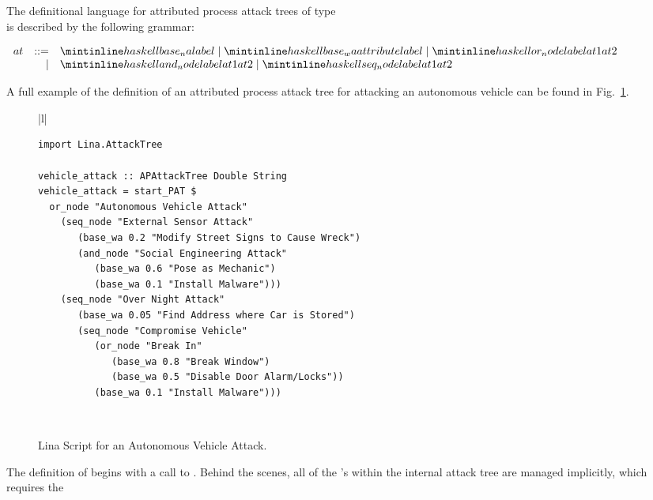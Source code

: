 \documentclass{llncs}
\begin{document}
The definitional language for attributed process attack trees of type \\
 is described by the following
grammar:
\begin{center}
  \footnotesize
  \begin{math}
    \begin{array}{lrlll}
      at & ::=  & \mh{base_na label} \mid \mh{base_wa attribute label} \mid \mh{or_node label at1 at2} \\
      & \mid & \mh{and_node label at1 at2} \mid \mh{seq_node label at1 at2}\\
    \end{array}
  \end{math}
\end{center}
A full example of the definition of an attributed process attack tree
for attacking an autonomous vehicle can be found in
Fig.~\ref{fig:vehicle_attack}. 
\begin{figure}
      \begin{tabular}{|l|}
        \hline\\[-7px]
      \begin{minipage}{\textwidth}
        \begin{verbatim}
import Lina.AttackTree

vehicle_attack :: APAttackTree Double String
vehicle_attack = start_PAT $
  or_node "Autonomous Vehicle Attack"
    (seq_node "External Sensor Attack"
       (base_wa 0.2 "Modify Street Signs to Cause Wreck")
       (and_node "Social Engineering Attack"
          (base_wa 0.6 "Pose as Mechanic")
          (base_wa 0.1 "Install Malware")))
    (seq_node "Over Night Attack"
       (base_wa 0.05 "Find Address where Car is Stored")
       (seq_node "Compromise Vehicle"
          (or_node "Break In"
             (base_wa 0.8 "Break Window")
             (base_wa 0.5 "Disable Door Alarm/Locks"))
          (base_wa 0.1 "Install Malware")))
        \end{verbatim}
        \vspace{2px}
      \end{minipage} \\
      \hline
    \end{tabular}
  \caption{Lina Script for an Autonomous Vehicle Attack.}
  \label{fig:vehicle_attack}
\end{figure}
The definition of  begins with a call to
.  Behind the scenes, all of the 's within the
internal attack tree are managed implicitly, which requires the
\end{document}
